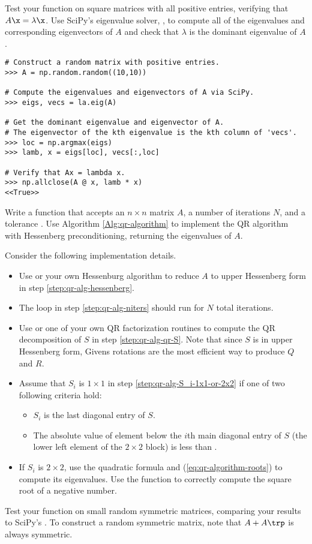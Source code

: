 Test your function on square matrices with all positive entries, verifying that $A\x = \lambda\x$.
Use SciPy's eigenvalue solver, , to compute all of the eigenvalues and corresponding eigenvectors of $A$ and check that $\lambda$ is the dominant eigenvalue of $A$.

\begin{lstlisting}
# Construct a random matrix with positive entries.
>>> A = np.random.random((10,10))

# Compute the eigenvalues and eigenvectors of A via SciPy.
>>> eigs, vecs = la.eig(A)

# Get the dominant eigenvalue and eigenvector of A.
# The eigenvector of the kth eigenvalue is the kth column of 'vecs'.
>>> loc = np.argmax(eigs)
>>> lamb, x = eigs[loc], vecs[:,loc]

# Verify that Ax = lambda x.
>>> np.allclose(A @ x, lamb * x)
<<True>>
\end{lstlisting}

Write a function that accepts an $n \times n$ matrix $A$, a number of iterations $N$, and a tolerance .
Use Algorithm \ref{Alg:qr-algorithm} to implement the QR algorithm with Hessenberg preconditioning, returning the eigenvalues of $A$.

Consider the following implementation details.
\begin{itemize}
    \item Use  or your own Hessenburg algorithm to reduce $A$ to upper Hessenberg form in step \ref{step:qr-alg-hessenberg}.
    \item The loop in step \ref{step:qr-alg-niters} should run for $N$ total iterations.
    \item Use  or one of your own QR factorization routines to compute the QR decomposition of $S$ in step \ref{step:qr-alg-qr-S}.
    Note that since $S$ is in upper Hessenberg form, Givens rotations are the most efficient way to produce $Q$ and $R$.
    \item Assume that $S_i$ is $1 \times 1$ in step \ref{step:qr-alg-S_i-1x1-or-2x2} if one of two following criteria hold:
    \begin{itemize}
        \item $S_i$ is the last diagonal entry of $S$.
        \item The absolute value of element below the $i$th main diagonal entry of $S$ (the lower left element of the $2\times 2$ block) is less than .
    \end{itemize}
    \item If $S_i$ is $2 \times 2$, use the quadratic formula and (\ref{eq:qr-algorithm-roots}) to compute its eigenvalues.
    Use the function  to correctly compute the square root of a negative number.
\end{itemize}

Test your function on small random symmetric matrices, comparing your results to SciPy's .
To construct a random symmetric matrix, note that $A + A\trp$ is always symmetric.
